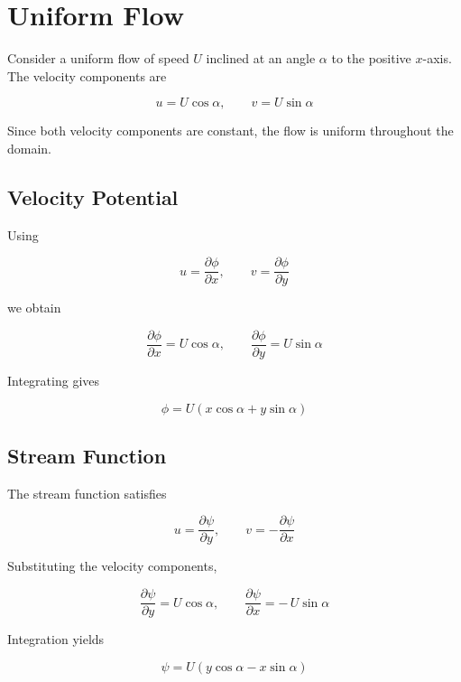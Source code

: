 \section{Uniform Flow}
\label{sec:uniform-flow}

Consider a uniform flow of speed $U$ inclined at an angle $\alpha$
to the positive $x$-axis.
The velocity components are

\[
u = U\cos\alpha,
\qquad
v = U\sin\alpha
\]

Since both velocity components are constant, the flow is uniform
throughout the domain.

\subsection{Velocity Potential}
\label{subsec:uniform-flow-velocity-potential}

Using

\[
u = \frac{\partial \phi}{\partial x},
\qquad
v = \frac{\partial \phi}{\partial y}
\]

we obtain

\[
\frac{\partial \phi}{\partial x}
=
U\cos\alpha,
\qquad
\frac{\partial \phi}{\partial y}
=
U\sin\alpha
\]

Integrating gives

\[
\boxed{
\phi
=
U(x\cos\alpha+y\sin\alpha)
}
\]

\subsection{Stream Function}
\label{subsec:uniform-flow-stream-function}

The stream function satisfies

\[
u=\frac{\partial\psi}{\partial y},
\qquad
v=-\frac{\partial\psi}{\partial x}
\]

Substituting the velocity components,

\[
\frac{\partial\psi}{\partial y}
=
U\cos\alpha,
\qquad
\frac{\partial\psi}{\partial x}
=
-\,U\sin\alpha
\]

Integration yields

\[
\boxed{
\psi
=
U(y\cos\alpha-x\sin\alpha)
}
\]
